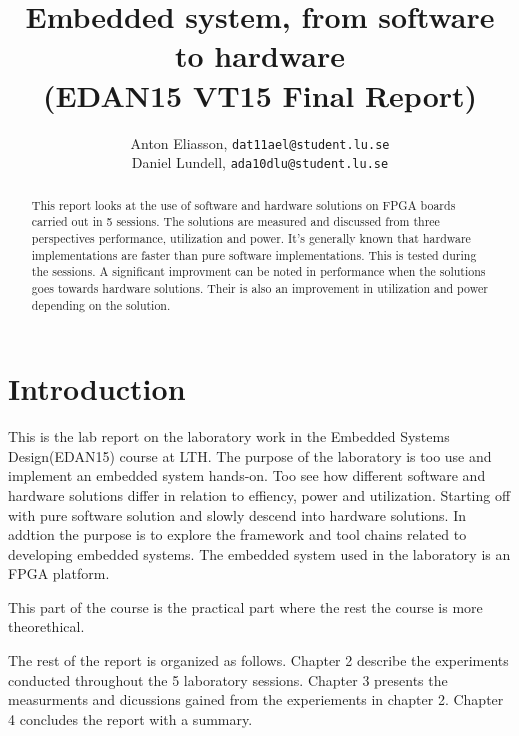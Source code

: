 \documentclass[11pt]{article}
\title{Embedded system, from software to hardware\\\small{(EDAN15 VT15 Final Report)}}
\author{
Anton Eliasson, \texttt{dat11ael@student.lu.se}\\
Daniel Lundell, \texttt{ada10dlu@student.lu.se}
}
\begin{document}
\lstset{
	language=C,
	captionpos=b,
	basicstyle=\footnotesize\ttfamily
}

\maketitle

\begin{abstract}
This report looks at the use of software and hardware solutions on FPGA boards carried out in 5 sessions. The solutions are measured and discussed from three perspectives performance, utilization and power. It's generally known that hardware implementations are faster than pure software implementations. This is tested during the sessions. A significant improvment can be noted in performance when the solutions goes towards hardware solutions. Their is also an improvement in utilization and power depending on the solution.
\end{abstract}
\section{Introduction}
This is the lab report on the laboratory work in the Embedded Systems Design(EDAN15) course at LTH. The purpose of the laboratory is too use and implement an embedded system hands-on. Too see how different software and hardware solutions differ in relation to effiency, power and utilization. Starting off with pure software solution and slowly descend into hardware solutions. In addtion the purpose is to explore the framework and tool chains related to developing embedded systems. The embedded system used in the laboratory is an FPGA platform.

This part of the course is the practical part where the rest the course is more theorethical.

The rest of the report is organized as follows. Chapter 2 describe the experiments conducted throughout the 5 laboratory sessions. Chapter 3 presents the measurments and dicussions gained from the experiements in chapter 2. Chapter 4 concludes the report with a summary.


\end{document}
